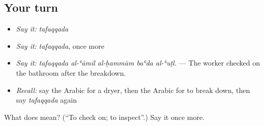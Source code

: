 \subsection*{Your turn}
\begin{itemize}
\raggedright
  \item \emph{Say it:} \emph{tafaqqada}
  \item \emph{Say it:} \emph{tafaqqada}, once more
  \item \emph{Say it:} \emph{tafaqqada al-ʿāmil al-ḥammām baʿda al-ʿuṭl.} — The worker checked on the bathroom after the breakdown.
  \item \emph{Recall:} say the Arabic for a dryer, then the Arabic for to break down, then say \emph{tafaqqada} again
\end{itemize}

\begin{tcolorbox}[breakable,colback=teal!4,colframe=teal!35!black,title={Before you move on}]
What does  mean? (\textquotedblleft{}To check on; to inspect\textquotedblright{}.) Say it once more.
\end{tcolorbox}
